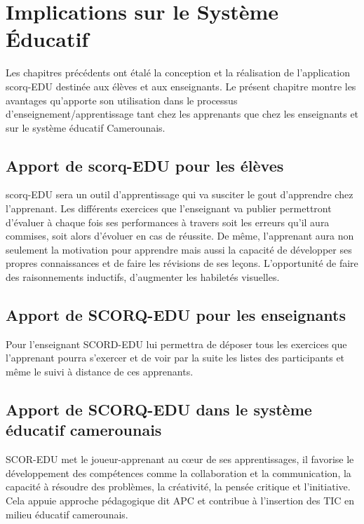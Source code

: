 \chapter{Implications sur le Système Éducatif}
\begin{onehalfspace}
\hspace{0.65cm}Les chapitres précédents ont étalé la conception et la réalisation de l’application \gls{scorq}-EDU destinée aux élèves et aux enseignants. Le présent chapitre montre les avantages qu’apporte son utilisation dans le processus d’enseignement/apprentissage tant chez les apprenants que chez les enseignants et sur le système éducatif Camerounais.
\section{Apport de \gls{scorq}-EDU pour les élèves }

\hspace{0.65cm}\gls{scorq}-EDU sera un outil d'apprentissage qui va susciter le gout d'apprendre chez l'apprenant. Les différents exercices que l’enseignant va publier permettront d'évaluer à chaque fois ses performances à travers soit les erreurs qu'il aura commises, soit alors d'évoluer en cas de réussite. De même, l'apprenant aura non seulement la motivation pour apprendre mais aussi la capacité de développer ses propres connaissances et de faire les révisions de ses leçons. L’opportunité de faire des raisonnements inductifs, d’augmenter les habiletés visuelles.
\section{Apport de SCORQ-EDU pour les enseignants}
\hspace{0.65cm}Pour l'enseignant SCORD-EDU lui permettra de déposer   tous les exercices que l'apprenant pourra s'exercer et de voir par la suite les listes des participants et même le suivi à distance de ces apprenants.
\section{Apport de SCORQ-EDU dans le système éducatif camerounais}
\hspace{0.65cm}SCOR-EDU met le joueur-apprenant au cœur de ses apprentissages, il favorise le développement des compétences comme la collaboration et la communication, la capacité à résoudre des problèmes, la créativité, la pensée critique et l’initiative. Cela appuie approche pédagogique dit APC et contribue à l’insertion des TIC en milieu éducatif camerounais.
\end{onehalfspace} 
